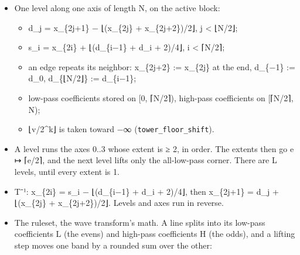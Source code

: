 \begin{itemize}
\item One level along one axis of length N, on the active block:

\begin{itemize}
\item d\_\allowbreak{}j = x\_\allowbreak{}\{2j+1\} − ⌊(x\_\allowbreak{}\{2j\} + x\_\allowbreak{}\{2j+2\})/2⌋, j < ⌊N/2⌋;
\item s\_\allowbreak{}i = x\_\allowbreak{}\{2i\} + ⌊(d\_\allowbreak{}\{i−1\} + d\_\allowbreak{}i + 2)/4⌋, i < ⌈N/2⌉;
\item an edge repeats its neighbor: x\_\allowbreak{}\{2j+2\} := x\_\allowbreak{}\{2j\} at the end, d\_\allowbreak{}\{−1\} := d\_\allowbreak{}0, d\_\allowbreak{}\{⌊N/2⌋\} := d\_\allowbreak{}\{i−1\};
\item low-pass coefficients stored on [0, ⌈N/2⌉), high-pass coefficients on [⌈N/2⌉, N);
\item ⌊v/2\textasciicircum{}k⌋ is taken toward −∞ (\texttt{tower\_\allowbreak{}floor\_\allowbreak{}shift}).
\end{itemize}
\item A level runs the axes 0..3 whose extent is ≥ 2, in order. The extents then go e ↦ ⌈e/2⌉, and the next level lifts only the all-low-pass corner. There are L levels, until every extent is 1.
\item T⁻¹: x\_\allowbreak{}\{2i\} = s\_\allowbreak{}i − ⌊(d\_\allowbreak{}\{i−1\} + d\_\allowbreak{}i + 2)/4⌋, then x\_\allowbreak{}\{2j+1\} = d\_\allowbreak{}j + ⌊(x\_\allowbreak{}\{2j\} + x\_\allowbreak{}\{2j+2\})/2⌋. Levels and axes run in reverse.
\item The ruleset, the wave transform's math. A line splits into its low-pass coefficients L (the evens) and high-pass coefficients H (the odds), and a lifting step moves one band by a rounded sum over the other:


\end{itemize}
